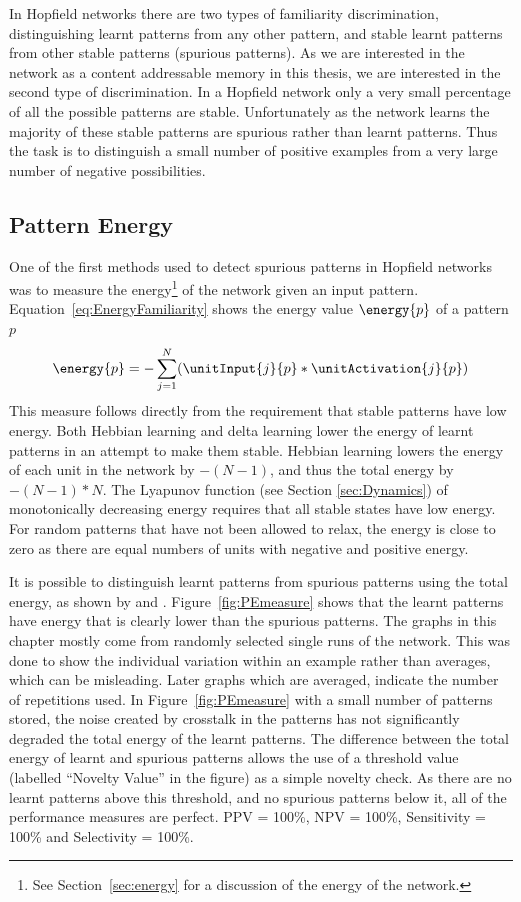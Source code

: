 In Hopfield networks there are two types of familiarity discrimination, distinguishing learnt patterns from any other pattern, and stable learnt patterns from other stable patterns (spurious patterns).  As we are interested in the network as a content addressable memory in this thesis, we are interested in the second type of discrimination.  In a Hopfield network only a very small percentage of all the possible patterns are stable.  Unfortunately as the network learns the majority of these stable patterns are spurious rather than learnt patterns.  Thus the task is to distinguish a small number of positive examples from a very large number of negative possibilities.

\subsection{Pattern Energy}
One of the first methods used to detect spurious patterns in Hopfield networks was to measure the energy\footnote{See Section~\ref{sec:energy} for a discussion of the energy of the network.}
of the network given an input pattern. Equation~\eqref{eq:EnergyFamiliarity} shows the energy value $\energy{p}$ of a pattern $p$
\begin{equation}
 \energy{p} = - \sum_{j=1}^{N} (\unitInput{j}{p} * \unitActivation{j}{p})
 \label{eq:EnergyFamiliarity}
\end{equation}
This measure follows directly from the requirement that stable patterns have low energy.  Both Hebbian learning and delta learning lower the energy of learnt patterns in an attempt to make them stable.  Hebbian learning lowers the energy of each unit in the network by \(-(N-1)\), and thus the total energy by \(-(N-1)*N\).  The Lyapunov function (see Section \ref{sec:Dynamics}) of monotonically decreasing energy requires that all stable states have low energy.  For random patterns that have not been allowed to relax, the energy is close to zero as there are equal numbers of units with negative and positive energy.

It is possible to distinguish learnt patterns from spurious patterns using the total energy, as shown by \citet{Bogacz01a} and \citet{Crook02}. Figure~\ref{fig:PEmeasure} shows that the learnt patterns have energy that is clearly lower than the spurious patterns.  The graphs in this chapter mostly come from randomly selected single runs of the network.  This was done to show the individual variation within an example rather than averages, which can be misleading.  Later graphs which are averaged, indicate the number of repetitions used. In Figure~\ref{fig:PEmeasure} with a small number of patterns stored, the noise created by crosstalk in the patterns has not significantly degraded the total energy of the learnt patterns.  The difference between the total energy of learnt and spurious patterns allows the use of a threshold value (labelled ``Novelty Value'' in the figure) as a simple novelty check. As there are no learnt patterns above this threshold, and no spurious patterns below it, all of the performance measures are perfect. PPV = 100\%, NPV = 100\%, Sensitivity = 100\% and Selectivity = 100\%.

